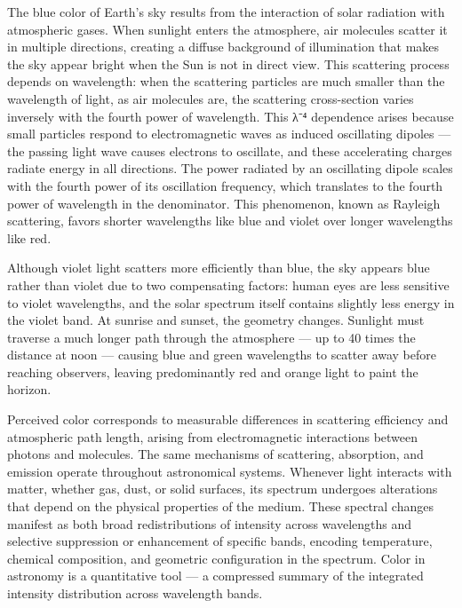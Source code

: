 The blue color of Earth's sky results from the interaction of solar radiation with atmospheric gases. When sunlight enters the atmosphere, air molecules scatter it in multiple directions, creating a diffuse background of illumination that makes the sky appear bright when the Sun is not in direct view. This scattering process depends on wavelength: when the scattering particles are much smaller than the wavelength of light, as air molecules are, the scattering cross-section varies inversely with the fourth power of wavelength. This λ⁻⁴ dependence arises because small particles respond to electromagnetic waves as induced oscillating dipoles — the passing light wave causes electrons to oscillate, and these accelerating charges radiate energy in all directions. The power radiated by an oscillating dipole scales with the fourth power of its oscillation frequency, which translates to the fourth power of wavelength in the denominator. This phenomenon, known as Rayleigh scattering, favors shorter wavelengths like blue and violet over longer wavelengths like red.

Although violet light scatters more efficiently than blue, the sky appears blue rather than violet due to two compensating factors: human eyes are less sensitive to violet wavelengths, and the solar spectrum itself contains slightly less energy in the violet band. At sunrise and sunset, the geometry changes. Sunlight must traverse a much longer path through the atmosphere — up to 40 times the distance at noon — causing blue and green wavelengths to scatter away before reaching observers, leaving predominantly red and orange light to paint the horizon.

Perceived color corresponds to measurable differences in scattering efficiency and atmospheric path length, arising from electromagnetic interactions between photons and molecules. The same mechanisms of scattering, absorption, and emission operate throughout astronomical systems. Whenever light interacts with matter, whether gas, dust, or solid surfaces, its spectrum undergoes alterations that depend on the physical properties of the medium. These spectral changes manifest as both broad redistributions of intensity across wavelengths and selective suppression or enhancement of specific bands, encoding temperature, chemical composition, and geometric configuration in the spectrum. Color in astronomy is a quantitative tool — a compressed summary of the integrated intensity distribution across wavelength bands.

